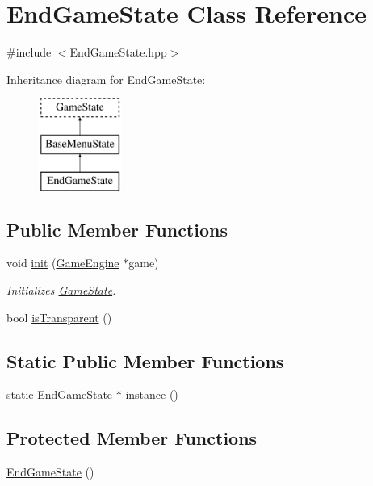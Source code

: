 \hypertarget{class_end_game_state}{}\section{End\+Game\+State Class Reference}
\label{class_end_game_state}


{\ttfamily \#include $<$End\+Game\+State.\+hpp$>$}

Inheritance diagram for End\+Game\+State\+:\begin{figure}[H]
\begin{center}
\leavevmode
\includegraphics[height=3.000000cm]{class_end_game_state}
\end{center}
\end{figure}
\subsection*{Public Member Functions}
\begin{DoxyCompactItemize}
\item 
void \mbox{\hyperlink{class_end_game_state_ac3abeb54305351ce65b66d519ca3e0c1}{init}} (\mbox{\hyperlink{class_game_engine}{Game\+Engine}} $\ast$game)
\begin{DoxyCompactList}\small\item\em Initializes \mbox{\hyperlink{class_game_state}{Game\+State}}. \end{DoxyCompactList}\item 
bool \mbox{\hyperlink{class_end_game_state_a0cafb4ddc794cdbde37e1624ef02bbf9}{is\+Transparent}} ()
\end{DoxyCompactItemize}
\subsection*{Static Public Member Functions}
\begin{DoxyCompactItemize}
\item 
static \mbox{\hyperlink{class_end_game_state}{End\+Game\+State}} $\ast$ \mbox{\hyperlink{class_end_game_state_acf46076d50ef1a957b0e42a4c7668578}{instance}} ()
\end{DoxyCompactItemize}
\subsection*{Protected Member Functions}
\begin{DoxyCompactItemize}
\item 
\mbox{\hyperlink{class_end_game_state_ae8a250f57fa5e2498782d6e78b095d00}{End\+Game\+State}} ()
\end{DoxyCompactItemize}
